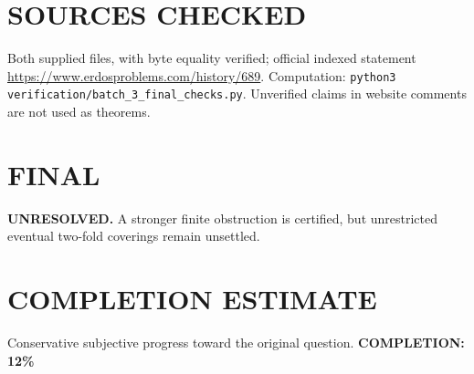 \section{SOURCES CHECKED}
Both supplied files, with byte equality verified; official indexed statement \url{https://www.erdosproblems.com/history/689}. Computation: \texttt{python3 verification/batch\_3\_final\_checks.py}. Unverified claims in website comments are not used as theorems.
\section{FINAL}
\textbf{UNRESOLVED.} A stronger finite obstruction is certified, but unrestricted eventual two-fold coverings remain unsettled.
\section{COMPLETION ESTIMATE}
Conservative subjective progress toward the original question.
\textbf{COMPLETION: 12\%}
